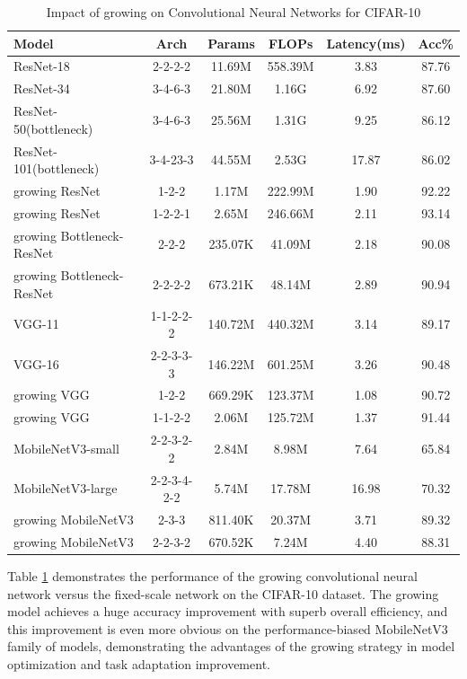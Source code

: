\documentclass[preprint,12pt]{elsarticle}
\begin{document}
\begin{table}[ht]
\centering
\tiny
\renewcommand{\arraystretch}{1.3}
\begin{adjustbox}{center}
\begin{tabular}{lccccc}
\hline
\textbf{Model} & \textbf{Arch} & \textbf{Params} & \textbf{FLOPs} & \textbf{Latency(ms)} & \textbf{Acc\%} \\
\hline
ResNet-18 & 2-2-2-2 & 11.69M & 558.39M & 3.83 & 87.76 \\
ResNet-34 & 3-4-6-3 & 21.80M & 1.16G & 6.92 & 87.60 \\
ResNet-50(bottleneck) & 3-4-6-3 & 25.56M & 1.31G & 9.25 & 86.12 \\
ResNet-101(bottleneck) & 3-4-23-3 & 44.55M & 2.53G & 17.87 & 86.02 \\
growing ResNet & 1-2-2 & 1.17M & 222.99M & 1.90 & 92.22 \\
growing ResNet & 1-2-2-1 & 2.65M & 246.66M & 2.11 & 93.14 \\
growing Bottleneck-ResNet & 2-2-2 & 235.07K & 41.09M & 2.18 & 90.08 \\
growing Bottleneck-ResNet & 2-2-2-2 & 673.21K & 48.14M & 2.89 & 90.94 \\ \hline
VGG-11 & 1-1-2-2-2 & 140.72M & 440.32M & 3.14 & 89.17 \\
VGG-16 & 2-2-3-3-3 & 146.22M & 601.25M & 3.26 & 90.48 \\
growing VGG & 1-2-2 & 669.29K & 123.37M & 1.08 & 90.72 \\
growing VGG & 1-1-2-2 & 2.06M & 125.72M & 1.37 & 91.44 \\ \hline
MobileNetV3-small & 2-2-3-2-2 & 2.84M & 8.98M & 7.64 & 65.84 \\
MobileNetV3-large & 2-2-3-4-2-2 & 5.74M & 17.78M & 16.98 & 70.32 \\
growing MobileNetV3 & 2-3-3 & 811.40K & 20.37M & 3.71 & 89.32 \\
growing MobileNetV3 & 2-2-3-2 & 670.52K & 7.24M & 4.40 & 88.31 \\
\hline
\end{tabular}
\end{adjustbox}
\caption{Impact of growing on Convolutional Neural Networks for CIFAR-10}
\label{table:cifar10_self_growth}
\end{table}

Table \ref{table:cifar10_self_growth} demonstrates the performance of the growing convolutional neural network versus the fixed-scale network on the CIFAR-10 dataset. The growing model achieves a huge accuracy improvement with superb overall efficiency, and this improvement is even more obvious on the performance-biased MobileNetV3 family of models, demonstrating the advantages of the growing strategy in model optimization and task adaptation improvement.
\end{document}
